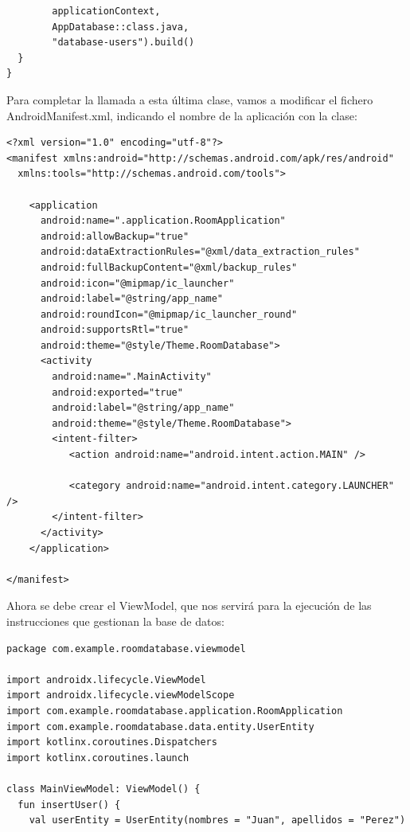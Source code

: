 \documentclass[10pt,letterpaper]{article}
\begin{document}
\newpage
\begin{lstlisting}
        applicationContext,
        AppDatabase::class.java,
        "database-users").build()
  }
}
\end{lstlisting}

Para completar la llamada a esta última clase, vamos a modificar el fichero AndroidManifest.xml, indicando el nombre de la aplicación con la clase:

\begin{lstlisting}
<?xml version="1.0" encoding="utf-8"?>
<manifest xmlns:android="http://schemas.android.com/apk/res/android"
  xmlns:tools="http://schemas.android.com/tools">

    <application
      android:name=".application.RoomApplication"
      android:allowBackup="true"
      android:dataExtractionRules="@xml/data_extraction_rules"
      android:fullBackupContent="@xml/backup_rules"
      android:icon="@mipmap/ic_launcher"
      android:label="@string/app_name"
      android:roundIcon="@mipmap/ic_launcher_round"
      android:supportsRtl="true"
      android:theme="@style/Theme.RoomDatabase">
      <activity
        android:name=".MainActivity"
        android:exported="true"
        android:label="@string/app_name"
        android:theme="@style/Theme.RoomDatabase">
        <intent-filter>
           <action android:name="android.intent.action.MAIN" />

           <category android:name="android.intent.category.LAUNCHER" />
        </intent-filter>
      </activity>
    </application>

</manifest>
\end{lstlisting}

Ahora se debe crear el ViewModel, que nos servirá para la ejecución de las instrucciones que gestionan la base de datos:

\begin{lstlisting}
package com.example.roomdatabase.viewmodel

import androidx.lifecycle.ViewModel
import androidx.lifecycle.viewModelScope
import com.example.roomdatabase.application.RoomApplication
import com.example.roomdatabase.data.entity.UserEntity
import kotlinx.coroutines.Dispatchers
import kotlinx.coroutines.launch

class MainViewModel: ViewModel() {
  fun insertUser() {
    val userEntity = UserEntity(nombres = "Juan", apellidos = "Perez")
\end{lstlisting}

\end{document}
